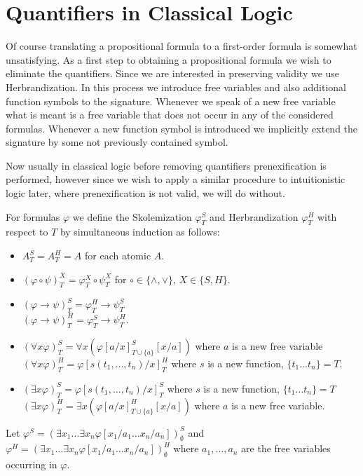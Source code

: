 \documentclass[a4paper,UKenglish,cleveref, autoref, thm-restate]{lipics-v2021}
\begin{document}
\section{Quantifiers in Classical Logic}

Of course translating a propositional formula to a first-order formula is somewhat unsatisfying. As a first step to obtaining a propositional formula we wish to eliminate the quantifiers. Since we are interested in preserving validity we use Herbrandization. In this process we introduce free variables and also additional function symbols to the signature. Whenever we speak of a new free variable what is meant is a free variable that does not occur in any of the considered formulas. Whenever a new function symbol is introduced we implicitly extend the signature by some not previously contained symbol.

Now usually in classical logic before removing quantifiers prenexification is performed, however since we wish to apply a similar procedure to intuitionistic logic later, where prenexification is not valid, we will do without.

\begin{definition}
	For formulas $\varphi$ we define the Skolemization $\varphi^S_T$ and Herbrandization $\varphi^H_T$ with respect to $T$ by simultaneous induction as follows:
	\begin{itemize}
		\item $A^S_T = A^H_T = A$ for each atomic $A$.
		\item $(\varphi\circ\psi)^X_T = \varphi^X_T\circ\psi^X_T$ for $\circ\in\{\wedge, \vee\}$, $X\in\{S, H\}$.
		\item $(\varphi\to\psi)^S_T = \varphi^H_T\to \psi^S_T$\\$(\varphi\to\psi)^H_T = \varphi^S_T\to\psi^H_T$.
		\item $(\forall x\varphi)^S_T = \forall x(\varphi[a/x]^S_{T\cup\{a\}}[x/a])$ where $a$ is a new free variable\\$(\forall x\varphi)^H_T = \varphi[s(t_1,\dots,t_n)/x]^H_T$ where $s$ is a new function, $\{t_1\dots t_n\} = T$.
		\item $(\exists x\varphi)^S_T = \varphi[s(t_1,\dots,t_n)/x]^S_T$ where $s$ is a new function, $\{t_1\dots t_n\} = T$\\$(\exists x\varphi)^H_T = \exists x(\varphi[a/x]^H_{T\cup\{a\}}[x/a])$ where $a$ is a new free variable.
	\end{itemize}
	Let $\varphi^S = (\exists x_1\dots\exists x_n \varphi[x_1/a_1\dots x_n/a_n])^S_\emptyset$ and $\varphi^H = (\exists x_1\dots\exists x_n \varphi[x_1/a_1\dots x_n/a_n])^H_\emptyset$ where $a_1,\dots,a_n$ are the free variables occurring in $\varphi$.
\end{definition}
\end{document}
